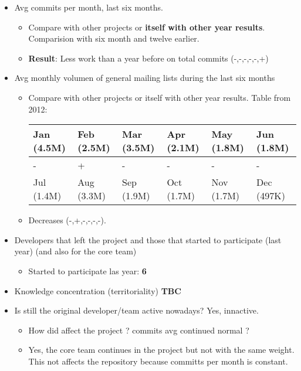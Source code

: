 \documentclass[11pt]{scrartcl}
\begin{document}
\begin{itemize}
    \item Avg commits per month, last six months.
        \begin{itemize}
            \item Compare with other projects or \textbf{itself with other year results}. Comparision with six month and twelve earlier.
            \item \textbf{Result}: Less work than a year before on total commits (-,-,-,-,-,+)
        \end{itemize}
    \item Avg monthly volumen of general mailing lists during the last six months
    \begin{itemize}
        \item Compare with other projects or itself with other year results. Table from 2012:

            \begin{tabular}{|l|l|l|l|l|l|}
                \hline
        	    Jan (4.5M) & Feb (2.5M) & Mar (3.5M) & Apr (2.1M) & May (1.8M) & Jun (1.8M)\\
        	    \hline
        	    - & + & - & - & - & -\\
                \hline
                Jul (1.4M) & Aug (3.3M) & Sep (1.9M) & Oct (1.7M) & Nov (1.7M) & Dec (497K)\\
                \hline
            \end{tabular}
        \item Decreases (-,+,-,-,-,-).
    \end{itemize}
    \item Developers that left the project and those that started to participate (last year) (and also for the core team)
    \begin{itemize}
        \item Started to participate las year: \textbf{6}
    \end{itemize}
    \item Knowledge concentration (territoriality) \textbf{TBC}
    \item Is still the original developer/team active nowadays? Yes, innactive.
    \begin{itemize}
        \item How did affect the project ? commits avg continued normal ?
        \item Yes, the core team continues in the project but not with the same weight. This not affects the repository because committs per month is constant.
    \end{itemize}
\end{itemize}
\end{document}
